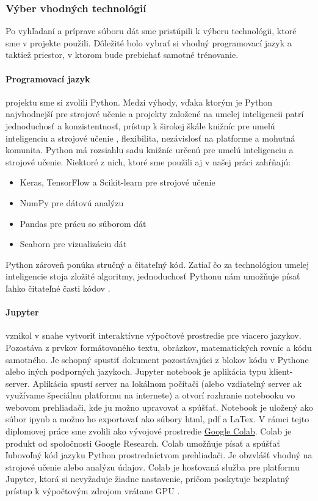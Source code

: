 \subsubsection{Výber vhodných technológií}
Po vyhľadaní a príprave súboru dát sme pristúpili k výberu technológii, ktoré sme v projekte použili. Dôležité bolo vybrať si vhodný programovací jazyk a taktiež priestor, v ktorom bude prebiehať samotné trénovanie.


\paragraph{Programovací jazyk} projektu sme si zvolili Python. Medzi výhody, vďaka ktorým je Python najvhodnejší pre strojové učenie a projekty založené na umelej inteligencii patrí jednoduchosť a konzistentnosť, prístup k širokej škále knižníc pre umelú inteligenciu a strojové učenie , flexibilita, nezávislosť na platforme a mohutná komunita. 
Python má rozsiahlu sadu knižníc určenú pre umelú inteligenciu a strojové učenie. Niektoré z nich, ktoré sme použili aj v našej práci zahŕňajú:
\begin{itemize}
    \item Keras, TensorFlow a Scikit-learn pre strojové učenie
    \item NumPy pre dátovú analýzu
    \item Pandas pre prácu so súborom dát
    \item Seaborn pre vizualizáciu dát
\end{itemize}
Python zároveň ponúka stručný a čitateľný kód. Zatiaľ čo za technológiou umelej inteligencie stoja zložité algoritmy, jednoduchosť Pythonu nám umožňuje písať ľahko čitateľné časti kódov \cite{python}. 

\paragraph{Jupyter} vznikol v snahe vytvoriť interaktívne výpočtové prostredie pre viacero jazykov. Pozostáva z prvkov formátovaného textu, obrázkov, matematických rovníc a kódu samotného. Je schopný spustiť dokument pozostávajúci z blokov kódu v Pythone alebo iných podporných jazykoch. Jupyter notebook je aplikácia typu klient-server. Aplikácia spustí server na lokálnom počítači (alebo vzdiatelný server ak využívame špeciálnu platformu na internete) a otvorí rozhranie notebooku vo webovom prehliadači, kde ju možno upravovať a spúšťať. Notebook je uložený ako súbor ipynb a možno ho exportovať ako súbory html, pdf a LaTex. 
V rámci tejto diplomovej práce sme zvolili ako vývojové prostredie \href{colab.google.com}{Google Colab}. Colab je produkt od spoločnosti Google Research. Colab umožňuje písať a spúšťať ľubovoľný kód jazyku Python prostredníctvom prehliadači. Je obzvlášť vhodný na strojové učenie alebo analýzu údajov. Colab je hosťovaná služba pre platformu Jupyter, ktorá si nevyžaduje žiadne nastavenie, pričom poskytuje bezplatný prístup k výpočtovým zdrojom vrátane GPU \cite{colab}.

